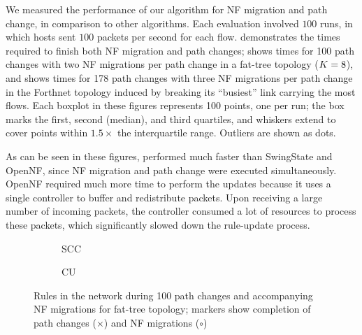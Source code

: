 We measured the performance of our algorithm for NF migration and path
change, in comparison to other algorithms.  Each evaluation involved
$100$ runs, in which hosts sent $100$ packets per second for each
flow.  demonstrates the times required to finish both
NF migration and path changes;  shows times for
100 path changes with two NF migrations per path change in a fat-tree
topology ($K = 8$), and  shows
times for 178 path changes with three NF migrations per path change in
the Forthnet topology induced by breaking its ``busiest'' link
carrying the most flows.  Each boxplot in these figures represents 100
points, one per run; the box marks the first, second (median), and
third quartiles, and whiskers extend to cover points within
$1.5\times$ the interquartile range.  Outliers are shown as dots.


As can be seen in these figures, \sysname performed much faster than
SwingState and OpenNF, since NF migration and path change were
executed simultaneously. OpenNF required much more time to perform the
updates because it uses a single controller to buffer and redistribute
packets. Upon receiving a large number of incoming packets, the
controller consumed a lot of resources to process these packets, which
significantly slowed down the rule-update process.


\begin{figure}[H]
\centering
   \begin{subfigure}[b]{0.69\linewidth}
    \resizebox{\textwidth}{!}{\footnotesize{}}
    \caption{SCC}
    \label{fig:rule_number:fat:scc}
  \end{subfigure}
  \par\bigskip
  \begin{subfigure}[b]{0.69\linewidth}
    \resizebox{\textwidth}{!}{\footnotesize{}}
    \caption{CU}
    \label{fig:rule_number:fat:scc}
  \end{subfigure}
  \par\bigskip
  \begin{subfigure}[b]{0.69\linewidth}
    \resizebox{\textwidth}{!}{\footnotesize{}}
    \caption{\ourRouteUpdateName}
    \label{fig:rule_number:fat:cu}
  \end{subfigure}
  \caption{Rules in the network during 100 path changes and
    accompanying NF migrations for fat-tree topology; markers show
    completion of path changes ($\times$) and NF migrations
    ({\LARGE $\circ$})}
\label{fig:rule_number:fat}
\end{figure}



